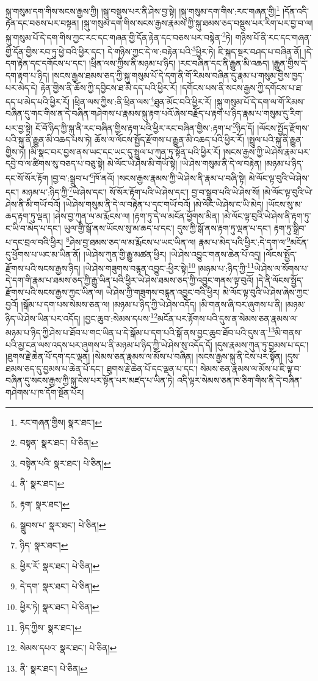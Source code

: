 སྐུ་གསུམ་དག་གིས་སངས་རྒྱས་ཀྱི། །སྐུ་བསྡུས་པར་ནི་ཤེས་བྱ་སྟེ། །སྐུ་གསུམ་དག་གིས་:རང་གཞན་གྱི།\footnote{རང་གཞན་གྱིས།  སྣར་ཐང་། } །དོན་འདི་རྟེན་དང་བཅས་པར་བསྟན། །སྐུ་གསུམ་དག་གིས་སངས་རྒྱས་རྣམས་ཀྱི་སྐུ་ཐམས་ཅད་བསྡུས་པར་རིག་པར་བྱ་བ་ལ། སྐུ་གསུམ་པོ་དེ་དག་གིས་ཀྱང་རང་དང་གཞན་གྱི་དོན་རྟེན་དང་བཅས་པར་བསྟེན་\footnote{བསྟན་  སྣར་ཐང་།  པེ་ཅིན། }ཏེ། གཉིས་པོ་ནི་རང་དང་གཞན་གྱི་དོན་གྱིས་རབ་ཏུ་ཕྱེ་བའི་ཕྱིར་དང་། དེ་གཉིས་ཀྱང་དེ་ལ་:བརྟེན་པའི་\footnote{བསྟེན་པའི་  སྣར་ཐང་།  པེ་ཅིན། }ཕྱིར་ཏེ། ཇི་སྐད་སྔར་བཤད་པ་བཞིན་ནོ། །དེ་དག་རྟེན་དང་དགོངས་པ་དང་། །ཕྲིན་ལས་ཀྱིས་ནི་མཉམ་པ་ཉིད། །རང་བཞིན་དང་ནི་རྒྱུན་མི་འཆད། །རྒྱུན་གྱིས་དེ་དག་རྟག་པ་ཉིད། །སངས་རྒྱས་ཐམས་ཅད་ཀྱི་སྐུ་གསུམ་པོ་དེ་དག་ནི་གོ་རིམས་བཞིན་དུ་རྣམ་པ་གསུམ་གྱིས་ཁྱད་པར་མེད་དེ། རྟེན་གྱིས་ནི་ཆོས་ཀྱི་དབྱིངས་ཐ་མི་དད་པའི་ཕྱིར་རོ། །དགོངས་པས་ནི་སངས་རྒྱས་ཀྱི་དགོངས་པ་ཐ་དད་པ་མེད་པའི་ཕྱིར་རོ། །ཕྲིན་ལས་ཀྱིས་:ནི་ཕྲིན་ལས་\footnote{ནི་  སྣར་ཐང་། }ཐུན་མོང་བའི་ཕྱིར་རོ། །སྐུ་གསུམ་པོ་དེ་དག་ལ་གོ་རིམས་བཞིན་དུ་གང་གིས་ན་དེ་བཞིན་གཤེགས་པ་རྣམས་སྐུ་རྟག་པའོ་ཞེས་བརྗོད་པ་རྟག་པ་ཉིད་རྣམ་པ་གསུམ་དུ་རིག་པར་བྱ་སྟེ། ངོ་བོ་ཉིད་ཀྱི་སྐུ་ནི་རང་བཞིན་གྱིས་རྟག་པའི་ཕྱིར་རང་བཞིན་གྱིས་:རྟག་པ་\footnote{རྟག་  སྣར་ཐང་། }ཉིད་དོ། །ལོངས་སྤྱོད་རྫོགས་པའི་སྐུ་ནི་རྒྱུན་མི་འཆད་པས་ཏེ། ཆོས་ལ་ལོངས་སྤྱོད་རྫོགས་པ་རྒྱུན་མི་འཆད་པའི་ཕྱིར་རོ། །སྤྲུལ་པའི་སྐུ་ནི་རྒྱུན་གྱིས་ཏེ། །མི་སྣང་བར་བྱས་ནས་ཡང་དང་ཡང་དུ་སྤྲུལ་པ་ཀུན་ཏུ་སྟོན་པའི་ཕྱིར་རོ། །སངས་རྒྱས་ཀྱི་ཡེ་ཤེས་རྣམ་པར་དབྱེ་བ་ལ་ཚིགས་སུ་བཅད་པ་བཅུ་སྟེ། མེ་ལོང་ཡེ་ཤེས་མི་གཡོ་སྟེ། །ཡེ་ཤེས་གསུམ་ནི་དེ་ལ་བརྟེན། །མཉམ་པ་ཉིད་དང་སོ་སོར་རྟོག །བྱ་བ་:སྒྲུབ་པ་\footnote{སྒྲུབས་པ་  སྣར་ཐང་།  པེ་ཅིན། }ཁོ་ནའོ། །སངས་རྒྱས་རྣམས་ཀྱི་ཡེ་ཤེས་ནི་རྣམ་པ་བཞི་སྟེ། མེ་ལོང་ལྟ་བུའི་ཡེ་ཤེས་དང་། མཉམ་པ་:ཉིད་ཀྱི་\footnote{ཉིད་  སྣར་ཐང་། }ཡེ་ཤེས་དང་། སོ་སོར་རྟོག་པའི་ཡེ་ཤེས་དང་། བྱ་བ་སྒྲུབ་པའི་ཡེ་ཤེས་སོ། །མེ་ལོང་ལྟ་བུའི་ཡེ་ཤེས་ནི་མི་གཡོ་བའོ། །ཡེ་ཤེས་གསུམ་ནི་དེ་ལ་བརྟེན་པ་དང་གཡོ་བའོ། །མེ་ལོང་ཡེ་ཤེས་ང་ཡི་མེད། །ཡོངས་སུ་མ་ཆད་རྟག་ཏུ་ལྡན། །ཤེས་བྱ་ཀུན་ལ་མ་རྨོངས་ལ། །རྟག་ཏུ་དེ་ལ་མངོན་ཕྱོགས་མིན། །མེ་ལོང་ལྟ་བུའི་ཡེ་ཤེས་ནི་རྟག་ཏུ་ང་ཡི་བ་མེད་པ་དང་། ཡུལ་གྱི་སྒོ་ནས་ཡོངས་སུ་མ་ཆད་པ་དང་། དུས་ཀྱི་སྒོ་ནས་རྟག་ཏུ་ལྡན་པ་དང་། རྟག་ཏུ་སྒྲིབ་པ་དང་བྲལ་བའི་ཕྱིར། \footnote{ཕྱིར་རོ་  སྣར་ཐང་།  པེ་ཅིན། }ཤེས་བྱ་ཐམས་ཅད་ལ་མ་རྨོངས་པ་ཡང་ཡིན་ལ། རྣམ་པ་མེད་པའི་ཕྱིར་:དེ་དག་ལ་\footnote{དེ་དག་  སྣར་ཐང་།  པེ་ཅིན། }མངོན་དུ་ཕྱོགས་པ་ཡང་མ་ཡིན་ནོ། །ཡེ་ཤེས་ཀུན་གྱི་རྒྱུ་མཚན་ཕྱིར། །ཡེ་ཤེས་འབྱུང་གནས་ཆེན་པོ་འདྲ། །ལོངས་སྤྱོད་རྫོགས་པའི་སངས་རྒྱས་ཉིད། །ཡེ་ཤེས་གཟུགས་བརྙན་འབྱུང་:ཕྱིར་སྟེ།\footnote{ཕྱིར་ཏེ།  སྣར་ཐང་།  པེ་ཅིན། } །མཉམ་པ་:ཉིད་ཀྱི་\footnote{ཉིད་ཀྱིས་  སྣར་ཐང་། }ཡེ་ཤེས་ལ་སོགས་པ་དེ་དག་གི་རྣམ་པ་ཐམས་ཅད་ཀྱི་རྒྱུ་ཡིན་པའི་ཕྱིར་ཡེ་ཤེས་ཐམས་ཅད་ཀྱི་འབྱུང་གནས་ལྟ་བུའོ། །དེ་ནི་ལོངས་སྤྱོད་རྫོགས་པའི་སངས་རྒྱས་ཀྱང་ཡིན་ལ། ཡེ་ཤེས་ཀྱི་གཟུགས་བརྙན་འབྱུང་བའི་ཕྱིར། མེ་ལོང་ལྟ་བུའི་ཡེ་ཤེས་ཞེས་ཀྱང་བྱའོ། །སྒོམ་པ་དག་པས་སེམས་ཅན་ལ། །མཉམ་པ་ཉིད་ཀྱི་ཡེ་ཤེས་འདོད། །མི་གནས་ཞི་བར་ཞུགས་པ་ནི། །མཉམ་ཉིད་ཡེ་ཤེས་ཡིན་པར་འདོད། །བྱང་ཆུབ་:སེམས་དཔས་\footnote{སེམས་དཔའ་  སྣར་ཐང་།  པེ་ཅིན། }མངོན་པར་རྟོགས་པའི་དུས་ན་སེམས་ཅན་རྣམས་ལ་མཉམ་པ་ཉིད་ཀྱི་ཤེས་པ་ཐོབ་པ་གང་ཡིན་པ་དེ་སྒོམ་པ་དག་པའི་སྒོ་ནས་བྱང་ཆུབ་ཐོབ་པའི་དུས་ན་\footnote{ནི་  སྣར་ཐང་།  པེ་ཅིན། }མི་གནས་པའི་མྱ་ངན་ལས་འདས་པར་ཞུགས་པ་ནི་མཉམ་པ་ཉིད་ཀྱི་ཡེ་ཤེས་སུ་འདོད་དོ། །དུས་རྣམས་ཀུན་ཏུ་བྱམས་པ་དང་། །ཐུགས་རྗེ་ཆེན་པོ་དག་དང་ལྡན། །སེམས་ཅན་རྣམས་ལ་མོས་པ་བཞིན། །སངས་རྒྱས་སྐུ་ནི་ངེས་པར་སྟོན། །དུས་ཐམས་ཅད་དུ་བྱམས་པ་ཆེན་པོ་དང་། ཐུགས་རྗེ་ཆེན་པོ་དང་ལྡན་པ་དང་། སེམས་ཅན་རྣམས་ལ་མོས་པ་ཇི་ལྟ་བ་བཞིན་དུ་སངས་རྒྱས་ཀྱི་སྐུ་ངེས་པར་སྟོན་པར་མཛད་པ་ཡིན་ཏེ། འདི་ལྟར་སེམས་ཅན་ཁ་ཅིག་གིས་ནི་དེ་བཞིན་གཤེགས་པ་ཁ་དོག་སྔོན་པོར། 
